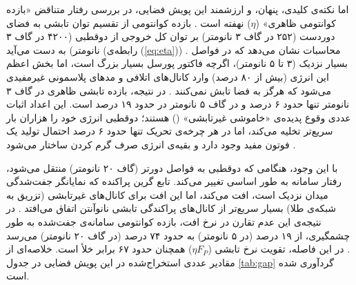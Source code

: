 \documentclass[12pt,a4paper]{report}
\begin{document}
اما نکته‌ی کلیدی، پنهان، و ارزشمند این پویش فضایی، در بررسی رفتار متناقض «بازده کوانتومی ظاهری» ($\eta$) نهفته است \cite{novotny,anger}. بازده کوانتومی از تقسیم توان تابشی به فضای دوردست (۲۵۲ در گاف ۳ نانومتر) بر توان کل خروجی از دوقطبی (۴۲۰۰ در گاف ۳ نانومتر) به دست می‌آید (رابطه‌ی (\ref{eq:eta})) \cite{novotny}. محاسبات نشان می‌دهد که در فواصل بسیار نزدیک (۳ تا ۵ نانومتر)، اگرچه فاکتور پورسل بسیار بزرگ است، اما بخش اعظم این انرژی (بیش از ۸۰ درصد) وارد کانال‌های اتلافی و مدهای پلاسمونی غیرمفیدی می‌شود که هرگز به فضا تابش نمی‌کنند \cite{novotny,maier}. در نتیجه، بازده تابشی ظاهری در گاف ۳ نانومتر تنها حدود ۶ درصد و در گاف ۵ نانومتر در حدود ۱۹ درصد است. این اعداد اثبات عددی وقوع پدیده‌ی «خاموشی غیرتابشی» () هستند؛ دوقطبی انرژی خود را هزاران بار سریع‌تر تخلیه می‌کند، اما در هر چرخه‌ی تحریک تنها حدود ۶ درصد احتمال تولید یک فوتون مفید وجود دارد و بقیه‌ی انرژی صرف گرم کردن ساختار می‌شود \cite{novotny,anger}.

با این وجود، هنگامی که دوقطبی به فواصل دورتر (گاف ۲۰ نانومتر) منتقل می‌شود، رفتار سامانه به طور اساسی تغییر می‌کند. تابع گرین پراکنده که نمایانگر جفت‌شدگی میدان نزدیک است، افت می‌کند، اما این افت برای کانال‌های غیرتابشی (تزریق به شبکه‌ی طلا) بسیار سریع‌تر از کانال‌های پراکندگی تابشی نانوآنتن اتفاق می‌افتد \cite{novotny,anger}. در نتیجه‌ی این عدم تقارن در نرخ افت، بازده کوانتومی سامانه‌ی جفت‌شده به طور چشمگیری، از ۱۹ درصد (در ۵ نانومتر) به حدود ۷۴ درصد (در گاف ۲۰ نانومتر) می‌رسد \cite{novotny}. در این فاصله، تقویت نرخ تابشی ($\eta F_P$) همچنان حدود ۶۷ برابر خلأ است. خلاصه‌ای از مقادیر عددی استخراج‌شده در این پویش فضایی در جدول \ref{tab:gap} گردآوری شده است.

\begin{table}[htbp]
\centering
\caption{خلاصه‌ی نتایج عددی استخراج‌شده از پویش فضایی گاف (در مد طولی تشدید، $\lambda\approx607$ نانومتر).}
\label{tab:gap}
\renewcommand{\arraystretch}{1.3}
\end{table}
\end{document}
